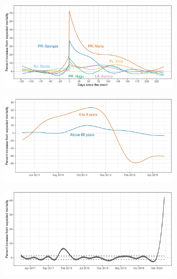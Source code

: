 \documentclass[11pt]{article}
\begin{document}
\begin{figure}[ht]
	\centering
	\begin{subfigure}[t]{0.49\linewidth}
		\centering
		\includegraphics[width=1\linewidth]{figs/figure-1a.pdf} 
		\caption{} 
		\label{fig:fhat-hurricanes}
	\end{subfigure}
	\hfill
	\begin{subfigure}[t]{0.49\linewidth}
		\centering
		\includegraphics[width=1\linewidth]{figs/figure-1b.pdf}
		\caption{} 
		\label{fig:fhat-chikungunya}
	\end{subfigure}
	\hfill
	\begin{subfigure}[t]{0.49\linewidth}
		\centering
		\includegraphics[width=1\linewidth]{figs/figure-1c.pdf}
		\caption{} 
		\label{fig:fhat-usa}
	\end{subfigure}
	\caption{}
	\label{fig:fhat-estimates}
\end{figure}
\end{document}

